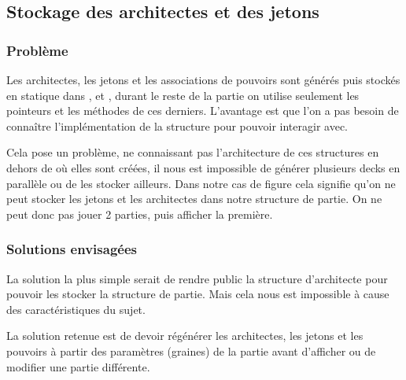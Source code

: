 
\subsection{Stockage des architectes et des jetons}

\subsubsection*{Problème}

Les architectes, les jetons  et les associations de pouvoirs sont générés puis stockés en statique dans ,  et , durant le reste de la partie on utilise seulement les pointeurs et les méthodes de ces derniers. L'avantage est que l'on a pas besoin de connaître l'implémentation de la structure pour pouvoir interagir avec.

Cela pose un problème, ne connaissant pas l'architecture de ces structures en dehors de où elles sont créées, il nous est impossible de générer plusieurs decks en parallèle ou de les stocker ailleurs. Dans notre cas de figure cela signifie qu'on ne peut stocker les jetons et les architectes dans notre structure de partie. On ne peut donc pas jouer 2 parties, puis afficher la première. 

\subsubsection*{Solutions envisagées}

La solution la plus simple serait de rendre public la structure d'architecte pour pouvoir les stocker la structure de partie. Mais cela nous est impossible à cause des caractéristiques du sujet.

La solution retenue est de devoir régénérer les architectes, les jetons et les pouvoirs à partir des paramètres (graines) de la partie avant d'afficher ou de modifier une partie différente.

